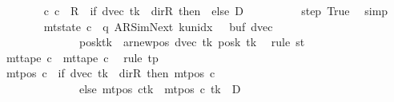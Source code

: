 \begin{isabellebody}
\ \ \ \ \ \ \isamarkupfalse%
\ {\isachardoublequoteopen}{\isacharparenleft}{\kern0pt}c{}{\isacharcomma}{\kern0pt}\ c{\isacharprime}{\kern0pt}{\isacharparenright}{\kern0pt}\ {\isasymin}\ {\isacharquery}{\kern0pt}R\ {\isacharcircum}{\kern0pt}{\isacharcircum}{\kern0pt}\ {\isacharparenleft}{\kern0pt}if\ dvec\ tk\ {\isacharequal}{\kern0pt}\ dir{\isachardot}{\kern0pt}R\ then\ {}\ else\ {\isacharquery}{\kern0pt}D{\isacharparenright}{\kern0pt}{\isachardoublequoteclose}\isanewline
\ \ \ \ \ \ \ \ \isamarkupfalse%
\ step\ True\ \isamarkupfalse%
\ simp\isanewline
\ \ \ \ \ \ \isamarkupfalse%
\ {\isachardoublequoteopen}mt{\isacharunderscore}{\kern0pt}state\ c{\isacharprime}{\kern0pt}\ {\isacharequal}{\kern0pt}\ {\isacharparenleft}{\kern0pt}q{\isacharcomma}{\kern0pt}\ AR{\isacharunderscore}{\kern0pt}SimNext{\isacharcomma}{\kern0pt}\ k{\isacharunderscore}{\kern0pt}unidx\ {}{\isacharcomma}{\kern0pt}\ {}{\isacharcomma}{\kern0pt}\ buf{\isacharcomma}{\kern0pt}\ dvec{\isacharcomma}{\kern0pt}\isanewline
\ \ \ \ \ \ \ \ \ \ \ \ \ \ posk{\isacharparenleft}{\kern0pt}tk\ {\isacharcolon}{\kern0pt}{\isacharequal}{\kern0pt}\ ar{\isacharunderscore}{\kern0pt}newpos\ {\isacharparenleft}{\kern0pt}dvec\ tk{\isacharparenright}{\kern0pt}\ {\isacharparenleft}{\kern0pt}posk\ tk{\isacharparenright}{\kern0pt}{\isacharparenright}{\kern0pt}{\isacharparenright}{\kern0pt}{\isachardoublequoteclose}\ \isamarkupfalse%
\ {\isacharparenleft}{\kern0pt}rule\ st{\isacharparenright}{\kern0pt}\isanewline
\ \ \ \ \ \ \isamarkupfalse%
\ {\isachardoublequoteopen}mt{\isacharunderscore}{\kern0pt}tape\ c{\isacharprime}{\kern0pt}\ {\isacharequal}{\kern0pt}\ mt{\isacharunderscore}{\kern0pt}tape\ c{}{\isachardoublequoteclose}\ \isamarkupfalse%
\ {\isacharparenleft}{\kern0pt}rule\ tp{\isacharparenright}{\kern0pt}\isanewline
\ \ \ \ \ \ \isamarkupfalse%
\ {\isachardoublequoteopen}mt{\isacharunderscore}{\kern0pt}pos\ c{\isacharprime}{\kern0pt}\ {\isacharequal}{\kern0pt}\ {\isacharparenleft}{\kern0pt}if\ dvec\ tk\ {\isacharequal}{\kern0pt}\ dir{\isachardot}{\kern0pt}R\ then\ mt{\isacharunderscore}{\kern0pt}pos\ c{}\isanewline
\ \ \ \ \ \ \ \ \ \ \ \ \ \ else\ {\isacharparenleft}{\kern0pt}mt{\isacharunderscore}{\kern0pt}pos\ c{}{\isacharparenright}{\kern0pt}{\isacharparenleft}{\kern0pt}tk\ {\isacharcolon}{\kern0pt}{\isacharequal}{\kern0pt}\ mt{\isacharunderscore}{\kern0pt}pos\ c{}\ tk\ {\isacharminus}{\kern0pt}\ {\isacharquery}{\kern0pt}D{\isacharparenright}{\kern0pt}{\isacharparenright}{\kern0pt}{\isachardoublequoteclose}\isanewline

\end{isabellebody}
